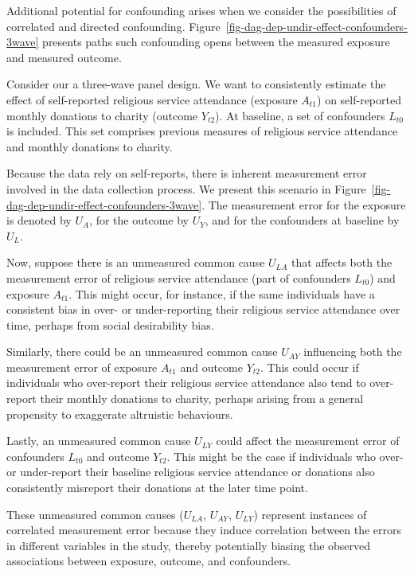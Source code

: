 \documentclass[
  singlecolumn]{report}
\begin{document}
Additional potential for confounding arises when we consider the
possibilities of correlated and directed confounding.
Figure~\ref{fig-dag-dep-undir-effect-confounders-3wave} presents paths
such confounding opens between the measured exposure and measured
outcome.

Consider our a three-wave panel design. We want to consistently estimate
the effect of self-reported religious service attendance (exposure
\(A_{t1}\)) on self-reported monthly donations to charity (outcome
\(Y_{t2}\)). At baseline, a set of confounders \(L_{t0}\) is included.
This set comprises previous measures of religious service attendance and
monthly donations to charity.

Because the data rely on self-reports, there is inherent measurement
error involved in the data collection process. We present this scenario
in Figure~\ref{fig-dag-dep-undir-effect-confounders-3wave}. The
measurement error for the exposure is denoted by \(U_A\), for the
outcome by \(U_Y\), and for the confounders at baseline by \(U_L\).

Now, suppose there is an unmeasured common cause \(U_{LA}\) that affects
both the measurement error of religious service attendance (part of
confounders \(L_{t0}\)) and exposure \(A_{t1}\). This might occur, for
instance, if the same individuals have a consistent bias in over- or
under-reporting their religious service attendance over time, perhaps
from social desirability bias.

Similarly, there could be an unmeasured common cause \(U_{AY}\)
influencing both the measurement error of exposure \(A_{t1}\) and
outcome \(Y_{t2}\). This could occur if individuals who over-report
their religious service attendance also tend to over-report their
monthly donations to charity, perhaps arising from a general propensity
to exaggerate altruistic behaviours.

Lastly, an unmeasured common cause \(U_{LY}\) could affect the
measurement error of confounders \(L_{t0}\) and outcome \(Y_{t2}\). This
might be the case if individuals who over- or under-report their
baseline religious service attendance or donations also consistently
misreport their donations at the later time point.

These unmeasured common causes (\(U_{LA}\), \(U_{AY}\), \(U_{LY}\))
represent instances of correlated measurement error because they induce
correlation between the errors in different variables in the study,
thereby potentially biasing the observed associations between exposure,
outcome, and confounders.
\end{document}
